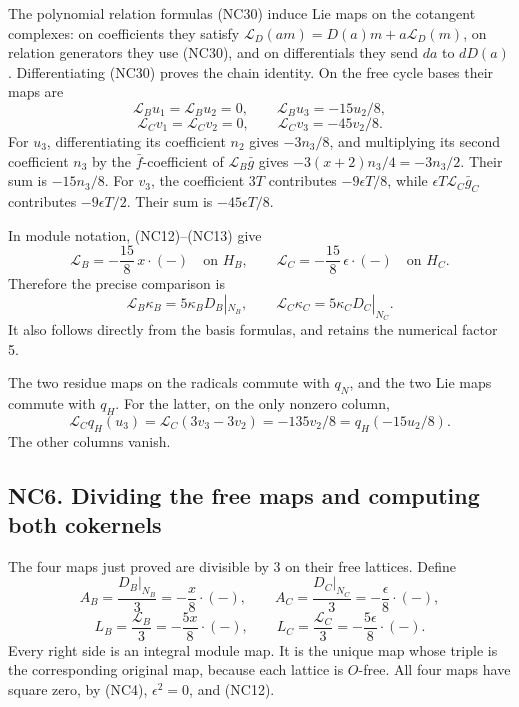 \documentclass[
]{article}
\begin{document}
The polynomial relation formulas (NC30) induce Lie maps on the cotangent
complexes: on coefficients they satisfy
\(\mathcal L_D(am)=D(a)m+a\mathcal L_D(m)\), on relation generators they
use (NC30), and on differentials they send \(da\) to \(dD(a)\).
Differentiating (NC30) proves the chain identity. On the free cycle
bases their maps are \[
\mathcal L_Bu_1=\mathcal L_Bu_2=0,\qquad
\mathcal L_Bu_3=-15u_2/8,
\] \[
\mathcal L_Cv_1=\mathcal L_Cv_2=0,\qquad
\mathcal L_Cv_3=-45v_2/8.
\tag{NC32}
\] For \(u_3\), differentiating its coefficient \(n_2\) gives
\(-3n_3/8\), and multiplying its second coefficient \(n_3\) by the
\(\bar f\)-coefficient of \(\mathcal L_B\bar g\) gives
\(-3(x+2)n_3/4=-3n_3/2\). Their sum is \(-15n_3/8\). For \(v_3\), the
coefficient \(3T\) contributes \(-9\epsilon T/8\), while
\(\epsilon T\mathcal L_C\bar g_C\) contributes \(-9\epsilon T/2\). Their
sum is \(-45\epsilon T/8\).

In module notation, (NC12)--(NC13) give \[
\mathcal L_B=-\frac{15}{8}\,x\cdot(-)\quad\text{on }H_B,\qquad
\mathcal L_C=-\frac{15}{8}\,\epsilon\cdot(-)\quad\text{on }H_C.
\tag{NC33}
\] Therefore the precise comparison is \[
\mathcal L_B\kappa_B=5\kappa_BD_B|_{N_B},\qquad
\mathcal L_C\kappa_C=5\kappa_CD_C|_{N_C}.
\tag{NC34}
\] It also follows directly from the basis formulas, and retains the
numerical factor 5.

The two residue maps on the radicals commute with \(q_N\), and the two
Lie maps commute with \(q_H\). For the latter, on the only nonzero
column, \[
\mathcal L_Cq_H(u_3)
=\mathcal L_C(3v_3-3v_2)=-135v_2/8
=q_H(-15u_2/8).
\tag{NC35}
\] The other columns vanish.

\subsection{NC6. Dividing the free maps and computing both
cokernels}\label{nc6.-dividing-the-free-maps-and-computing-both-cokernels}

The four maps just proved are divisible by 3 on their free lattices.
Define \[
A_B=\frac{D_B|_{N_B}}3=-\frac{x}{8}\cdot(-),\qquad
A_C=\frac{D_C|_{N_C}}3=-\frac{\epsilon}{8}\cdot(-),
\] \[
L_B=\frac{\mathcal L_B}3=-\frac{5x}{8}\cdot(-),\qquad
L_C=\frac{\mathcal L_C}3=-\frac{5\epsilon}{8}\cdot(-).
\tag{NC36}
\] Every right side is an integral module map. It is the unique map
whose triple is the corresponding original map, because each lattice is
\(O\)-free. All four maps have square zero, by (NC4), \(\epsilon^2=0\),
and (NC12).
\end{document}
